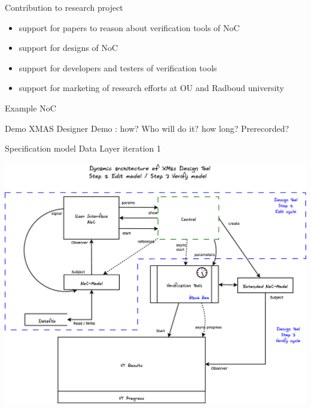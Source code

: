 \documentclass[11pt]{beamer}
\begin{document}
\begin{frame}{Contribution to research project}

	\begin{itemize}
		\item support for papers to reason about verification tools of NoC
		\item support for designs of NoC
		\item support for developers and testers of verification tools
		\item support for marketing of research efforts at OU and Radboud university
	\end{itemize}

\end{frame}

\begin{frame}{Example NoC}

\end{frame}

\begin{frame}{Demo XMAS Designer}
	Demo : how? Who will do it? how long? Prerecorded?
\end{frame}

\begin{frame}{Specification model Data Layer iteration 1}

	\includegraphics[width=.95\linewidth]{pictures/1c-architecture-dynamic-1}

\end{frame}
\end{document}
